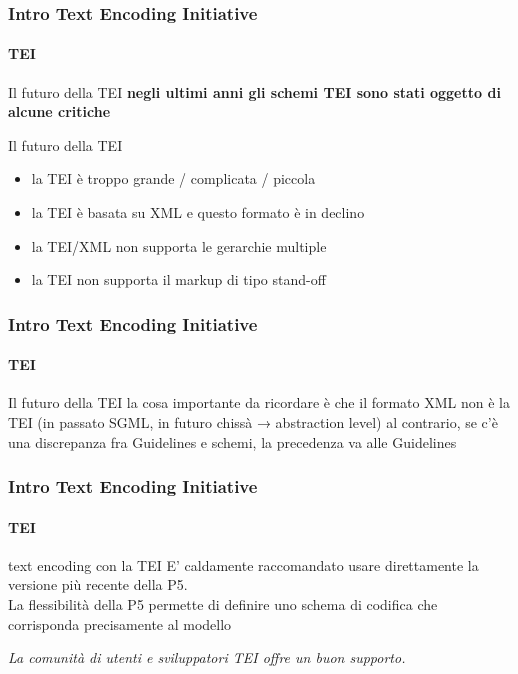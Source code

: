 



\begin{frame}
	\frametitle{Intro Text Encoding Initiative}
	\framesubtitle{TEI}
	\addtocounter{nframe}{1}

	\begin{block}{Il futuro della TEI}
		\textbf{negli ultimi anni gli schemi TEI sono stati oggetto di alcune critiche}
	\end{block}

	\begin{block}{Il futuro della TEI}
		\begin{itemize}
			\item la TEI è troppo grande / complicata / piccola
			\item la TEI è basata su XML e questo formato è in declino
			\item la TEI/XML non supporta le gerarchie multiple
			\item la TEI non supporta il markup di tipo stand-off
		\end{itemize}
	\end{block}

\end{frame}


\begin{frame}
	\frametitle{Intro Text Encoding Initiative}
	\framesubtitle{TEI}
	\addtocounter{nframe}{1}

	\begin{block}{Il futuro della TEI}
		la cosa importante da ricordare è che il formato XML non è
		la TEI (in passato SGML, in futuro chissà → abstraction level)
		al contrario, se c’è una discrepanza fra Guidelines e schemi,
		la precedenza va alle Guidelines
	\end{block}

\end{frame}


\begin{frame}
	\frametitle{Intro Text Encoding Initiative}
	\framesubtitle{TEI}
	\addtocounter{nframe}{1}

	\begin{block}{text encoding con la TEI}
		E' caldamente raccomandato usare direttamente la
		versione più recente della P5.\\
		La flessibilità della P5 permette di definire uno schema di
		codifica che corrisponda precisamente al modello
    \end{block}
    
    \textit{La comunità di utenti e sviluppatori TEI offre un buon supporto.}

\end{frame}




